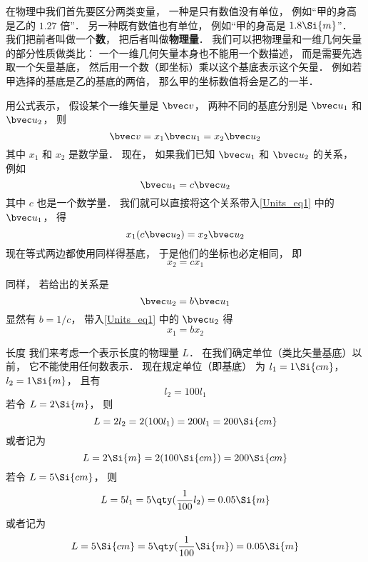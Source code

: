 

在物理中我们首先要区分两类变量， 一种是只有数值没有单位， 例如“甲的身高是乙的 $1.27$ 倍”． 另一种既有数值也有单位， 例如“甲的身高是 $1.8\Si{m}$”． 我们把前者叫做一个\textbf{数}， 把后者叫做\textbf{物理量}． 我们可以把物理量和一维几何矢量的部分性质做类比： 一个一维几何矢量本身也不能用一个数描述， 而是需要先选取一个矢量基底， 然后用一个数（即坐标）乘以这个基底表示这个矢量． 例如若甲选择的基底是乙的基底的两倍， 那么甲的坐标数值将会是乙的一半．

用公式表示， 假设某个一维矢量是 $\bvec v$， 两种不同的基底分别是 $\bvec u_1$ 和 $\bvec u_2$， 则
\begin{equation}\label{Units_eq1}
\bvec v = x_1 \bvec u_1 = x_2 \bvec u_2
\end{equation}
其中 $x_1$ 和 $x_2$ 是数学量． 现在， 如果我们已知 $\bvec u_1$ 和 $\bvec u_2$ 的关系， 例如
\begin{equation}\label{Units_eq2}
\bvec u_1 = c \bvec u_2
\end{equation}
其中 $c$ 也是一个数学量． 我们就可以直接将这个关系带入\autoref{Units_eq1} 中的 $\bvec u_1$， 得
\begin{equation}
x_1 (c \bvec u_2) = x_2 \bvec u_2
\end{equation}
现在等式两边都使用同样得基底， 于是他们的坐标也必定相同， 即
\begin{equation}
x_2 = c x_1
\end{equation}

同样， 若给出的关系是
\begin{equation}
\bvec u_2 = b\bvec u_1
\end{equation}
显然有 $b = 1/c$， 带入\autoref{Units_eq1} 中的 $\bvec u_2$ 得
\begin{equation}
x_1 = b x_2
\end{equation}

\begin{example}{长度}
我们来考虑一个表示长度的物理量 $L$． 在我们确定单位（类比矢量基底）以前， 它不能使用任何数表示． 现在规定单位（即基底） 为 $l_1 = 1\Si{cm}$， $l_2 = 1\Si{m}$， 且有
\begin{equation}
l_2 = 100 l_1
\end{equation}
若令 $L = 2\Si{m}$， 则
\begin{equation}
L = 2 l_2 = 2 (100 l_1) = 200 l_1 = 200 \Si{cm}
\end{equation}
或者记为
\begin{equation}
L = 2 \Si{m} = 2 (100 \Si{cm}) = 200 \Si{cm}
\end{equation}
若令 $L = 5\Si{cm}$， 则
\begin{equation}
L = 5 l_1 = 5 \qty(\frac{1}{100} l_2) = 0.05 \Si{m}
\end{equation}
或者记为
\begin{equation}
L = 5 \Si{cm} = 5 \qty(\frac{1}{100} \Si{m}) = 0.05 \Si{m}
\end{equation}
\end{example}
